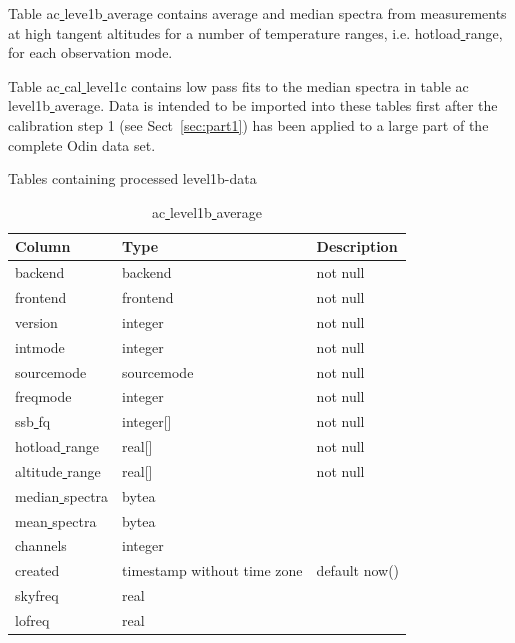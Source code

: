 \documentclass[12pt]{article}
\begin{document}
Table ac\underline{ }leve1b\underline{ }average  contains average
and median spectra from measurements at high tangent altitudes
for a number of temperature ranges, i.e. hotload\underline{ }range, 
for each observation mode. 

Table ac\underline{ }cal\underline{ }level1c contains low pass fits to 
the median spectra in table ac\underline{ }level1b\underline{ }average. 
Data is intended to be imported into these tables 
first after the calibration step 1 (see Sect~\ref{sec:part1})  
has been applied to a large part of the complete Odin data set. 



\begin{table}
\begin{tiny}
\captionsetup{font=scriptsize}
\caption{Tables containing processed level1b-data}
\label{table:ac1c}
\begin{subtable}{.9\linewidth}
\centering
\captionsetup{font=scriptsize}
\caption{ac\underline{ }level1b\underline{ }average}
\label{table:ac1c1}
\begin{tabular}{l l l}
\hline\hline
Column & Type & Description \\ [0.5ex]
\hline
 backend        & backend                     & not null\\
 frontend       & frontend                    & not null\\
 version        & integer                     & not null\\
 intmode        & integer                     & not null\\
 sourcemode     & sourcemode                  & not null\\
 freqmode       & integer                     & not null\\
 ssb\underline{ }fq         & integer[]                   & not null\\
 hotload\underline{ }range  & real[]                      & not null\\
 altitude\underline{ }range & real[]                      & not null\\
 median\underline{ }spectra & bytea                       & \\
 mean\underline{ }spectra   & bytea                       & \\
 channels       & integer                     & \\
 created        & timestamp without time zone & default now()\\
 skyfreq        & real                        & \\
 lofreq         & real                        & \\[1ex]
\hline
\end{tabular}
\end{subtable}
\newline
   \newline


\end{tiny}
\end{table}
\end{document}
